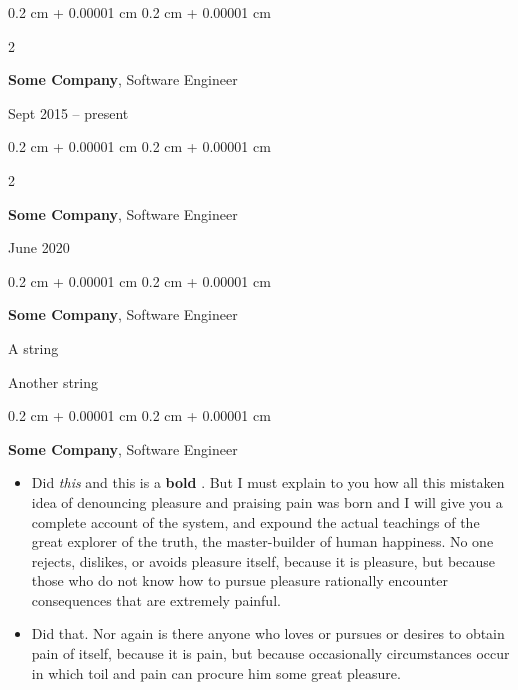 \documentclass[10pt, letterpaper]{article}
\newenvironment{summary}{
    \begin{description}[
        topsep=0.10 cm,
        parsep=0.10 cm,
        partopsep=0pt,
        itemsep=0pt,
        leftmargin=0.4 cm + 10pt
    ]
}{
    \end{description}
} %
\newenvironment{highlights}{
    \begin{itemize}[
        topsep=0.10 cm,
        parsep=0.10 cm,
        partopsep=0pt,
        itemsep=0pt,
        leftmargin=0.4 cm + 10pt
    ]
}{
    \end{itemize}
} %
\newenvironment{onecolentry}{
    \begin{adjustwidth}{
        0.2 cm + 0.00001 cm
    }{
        0.2 cm + 0.00001 cm
    }
}{
    \end{adjustwidth}
} %
\newenvironment{twocolentry}[2][]{
    \onecolentry
    \def\secondColumn{#2}
    \setcolumnwidth{\fill, 4.5 cm}
    \begin{paracol}{2}
}{
    \switchcolumn \raggedleft \secondColumn
    \end{paracol}
    \endonecolentry
} %
\let\hrefWithoutArrow\href
\renewcommand{\href}[2]{\hrefWithoutArrow{#1}{\ifthenelse{\equal{#2}{}}{ }{#2 }\raisebox{.15ex}{\footnotesize \faExternalLink*}}}
\begin{document}
        \begin{twocolentry}{
            Sept 2015 – present
        }
            \textbf{Some \textnormal{Company}}, Software Engineer
        \end{twocolentry}


        \vspace{0.2 cm}

        \begin{twocolentry}{
            June 2020
        }
            \textbf{Some \textnormal{Company}}, Software Engineer
        \end{twocolentry}


        \vspace{0.2 cm}

        \begin{onecolentry}
            \textbf{Some \textnormal{Company}}, Software Engineer
            \begin{summary}
                \item A string
                \item Another string
            \end{summary}
        \end{onecolentry}


        \vspace{0.2 cm}

        \begin{onecolentry}
            \textbf{Some \textnormal{Company}}, Software Engineer
            \begin{highlights}
                \item Did \textit{this} and this is a \textbf{bold} \href{https://example.com}{link}. But I must explain to you how all this mistaken idea of denouncing pleasure and praising pain was born and I will give you a complete account of the system, and expound the actual teachings of the great explorer of the truth, the master-builder of human happiness. No one rejects, dislikes, or avoids pleasure itself, because it is pleasure, but because those who do not know how to pursue pleasure rationally encounter consequences that are extremely painful.
                \item Did that. Nor again is there anyone who loves or pursues or desires to obtain pain of itself, because it is pain, but because occasionally circumstances occur in which toil and pain can procure him some great pleasure.
            \end{highlights}
        \end{onecolentry}
\end{document}
